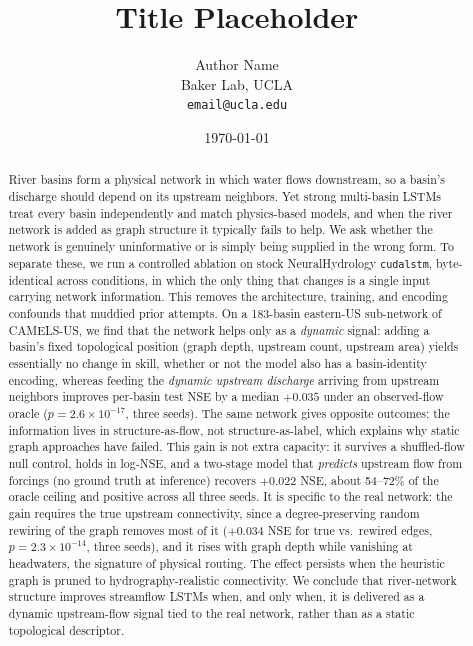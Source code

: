 \documentclass[11pt]{article}
\title{Title Placeholder}
\author{%
  Author Name\\
  Baker Lab, UCLA\\
  \texttt{email@ucla.edu}%
}
\date{\today}
\begin{document}
\maketitle

\begin{abstract}
River basins form a physical network in which water flows downstream, so a basin's
discharge should depend on its upstream neighbors. Yet strong multi-basin LSTMs treat
every basin independently and match physics-based models, and when the river network is
added as graph structure it typically fails to help. We ask whether the network is
genuinely uninformative or is simply being supplied in the wrong form. To separate these,
we run a controlled ablation on stock NeuralHydrology \texttt{cudalstm}, byte-identical
across conditions, in which the only thing that changes is a single input carrying
network information. This removes the architecture, training, and encoding confounds that
muddied prior attempts. On a 183-basin eastern-US sub-network of CAMELS-US, we find that
the network helps only as a \emph{dynamic} signal: adding a basin's fixed topological
position (graph depth, upstream count, upstream area) yields essentially no change in
skill, whether or not the model also has a basin-identity encoding, whereas feeding the
\emph{dynamic upstream discharge} arriving from upstream neighbors improves per-basin
test NSE by a median $+0.035$ under an observed-flow oracle ($p=2.6\times10^{-17}$, three seeds). The
same network gives opposite outcomes: the information lives in structure-as-flow, not
structure-as-label, which explains why static graph approaches have failed.
This gain is not extra capacity: it survives a shuffled-flow null control, holds in
log-NSE, and a two-stage model that \emph{predicts} upstream flow from forcings (no ground
truth at inference) recovers $+0.022$ NSE, about 54--72\% of the oracle ceiling and
positive across all three seeds. It is specific to the real network: the gain requires the
true upstream connectivity, since a degree-preserving random
rewiring of the graph removes most of it ($+0.034$ NSE for true vs.\ rewired edges,
$p=2.3\times10^{-14}$, three seeds), and it rises with graph depth while vanishing at
headwaters, the signature of physical routing. The effect persists when the heuristic graph
is pruned to hydrography-realistic connectivity. We conclude that river-network structure
improves streamflow LSTMs when, and only when, it is delivered as a dynamic upstream-flow
signal tied to the real network, rather than as a static topological descriptor.
\end{abstract}
\end{document}
